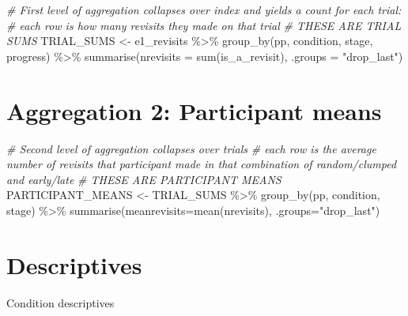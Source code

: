 \documentclass[
]{book}
\newenvironment{Shaded}{\begin{snugshade}}{\end{snugshade}}
\newcommand{\AttributeTok}[1]{\textcolor[rgb]{0.77,0.63,0.00}{#1}}
\newcommand{\CommentTok}[1]{\textcolor[rgb]{0.56,0.35,0.01}{\textit{#1}}}
\newcommand{\FunctionTok}[1]{\textcolor[rgb]{0.00,0.00,0.00}{#1}}
\newcommand{\NormalTok}[1]{#1}
\newcommand{\OtherTok}[1]{\textcolor[rgb]{0.56,0.35,0.01}{#1}}
\newcommand{\SpecialCharTok}[1]{\textcolor[rgb]{0.00,0.00,0.00}{#1}}
\newcommand{\StringTok}[1]{\textcolor[rgb]{0.31,0.60,0.02}{#1}}
\begin{document}
\begin{Shaded}
\begin{Highlighting}[]
\CommentTok{\# First level of aggregation collapses over index and yields a count for each trial: }
\CommentTok{\# each row is how many revisits they made on that trial}
\CommentTok{\# THESE ARE TRIAL SUMS}
\NormalTok{TRIAL\_SUMS }\OtherTok{\textless{}{-}}
\NormalTok{  e1\_revisits }\SpecialCharTok{\%\textgreater{}\%} 
  \FunctionTok{group\_by}\NormalTok{(pp, condition, stage, progress) }\SpecialCharTok{\%\textgreater{}\%} 
  \FunctionTok{summarise}\NormalTok{(}\AttributeTok{nrevisits =} \FunctionTok{sum}\NormalTok{(is\_a\_revisit), }\AttributeTok{.groups =} \StringTok{"drop\_last"}\NormalTok{)}
\end{Highlighting}
\end{Shaded}

\hypertarget{aggregation-2-participant-means}{%
\section{Aggregation 2: Participant means}\label{aggregation-2-participant-means}}

\begin{Shaded}
\begin{Highlighting}[]
\CommentTok{\# Second level of aggregation collapses over trials}
\CommentTok{\# each row is the average number of revisits that participant made in that combination of random/clumped and early/late}
\CommentTok{\# THESE ARE PARTICIPANT MEANS}
\NormalTok{PARTICIPANT\_MEANS }\OtherTok{\textless{}{-}} 
\NormalTok{  TRIAL\_SUMS }\SpecialCharTok{\%\textgreater{}\%} 
  \FunctionTok{group\_by}\NormalTok{(pp, condition, stage) }\SpecialCharTok{\%\textgreater{}\%} 
  \FunctionTok{summarise}\NormalTok{(}\AttributeTok{meanrevisits=}\FunctionTok{mean}\NormalTok{(nrevisits), }\AttributeTok{.groups=}\StringTok{"drop\_last"}\NormalTok{)}
\end{Highlighting}
\end{Shaded}

\hypertarget{descriptives}{%
\section{Descriptives}\label{descriptives}}

Condition descriptives
\end{document}
